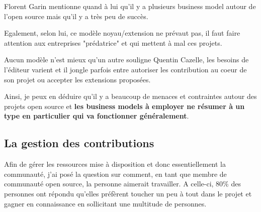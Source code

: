 			Florent Garin mentionne quand à lui qu'il y a plusieurs business model autour de l'open source mais qu'il y a très peu de succès.

			\begin{center}
				\textit{
				}
			\end{center}

			Egalement, selon lui, ce modèle noyau/extension ne prévaut pas, il faut faire attention aux entreprises "prédatrice" et qui mettent à mal ces projets.

			\begin{center}
				\textit{
				}
			\end{center}

			Aucun modèle n'est mieux qu'un autre souligne Quentin Cazelle, les besoins de l'éditeur varient et il jongle parfois entre autoriser les contribution au coeur de son projet ou accepter les extensions proposées.

			Ainsi, je peux en déduire qu'il y a beaucoup de menaces et contraintes autour des projets open source et \textbf{les business models à employer ne résumer à un type en particulier qui va fonctionner généralement}.

		\subsection{La gestion des contributions}

			Afin de gérer les ressources mise à disposition et donc essentiellement la communauté, j'ai posé la question sur comment, en tant que membre de communauté open source, la personne aimerait travailler. A celle-ci, 80\% des personnes ont répondu qu'elles préfèrent toucher un peu à tout dans le projet et gagner en connaissance en sollicitant une multitude de personnes.

